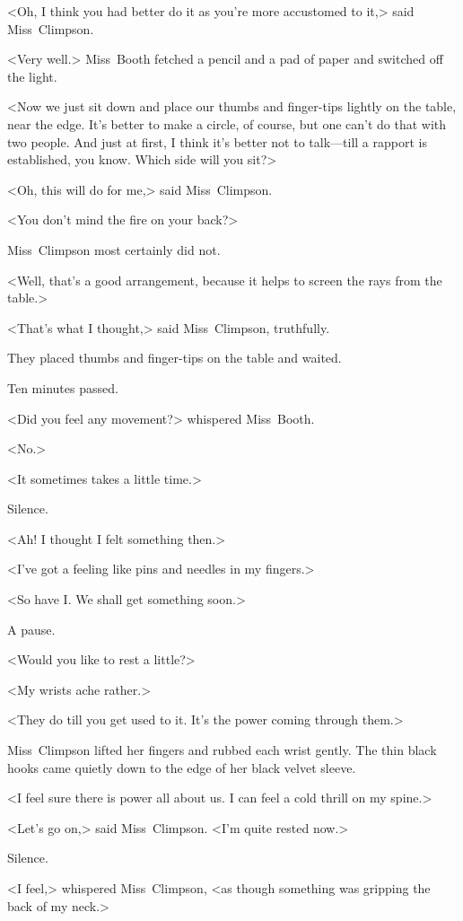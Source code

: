 <Oh, I think you had better do it as you're more accustomed to it,> said Miss~Climpson.

<Very well.> Miss~Booth fetched a pencil and a pad of paper and switched off the light.

<Now we just sit down and place our thumbs and finger-tips lightly on the table, near the edge. It's better to make a circle, of course, but one can't do that with two people. And just at first, I think it's better not to talk—till a rapport is established, you know. Which side will you sit?>

<Oh, this will do for me,> said Miss~Climpson.

<You don't mind the fire on your back?>

Miss~Climpson most certainly did not.

<Well, that's a good arrangement, because it helps to screen the rays from the table.>

<That's what I thought,> said Miss~Climpson, truthfully.

They placed thumbs and finger-tips on the table and waited.

Ten minutes passed.

<Did you feel any movement?> whispered Miss~Booth.

<No.>

<It sometimes takes a little time.>

Silence.

<Ah! I thought I felt something then.>

<I've got a feeling like pins and needles in my fingers.>

<So have I\@. We shall get something soon.>

A pause.

<Would you like to rest a little?>

<My wrists ache rather.>

<They do till you get used to it. It's the power coming through them.>

Miss~Climpson lifted her fingers and rubbed each wrist gently. The thin black hooks came quietly down to the edge of her black velvet sleeve.

<I feel sure there is power all about us. I can feel a cold thrill on my spine.>

<Let's go on,> said Miss~Climpson. <I'm quite rested now.>

Silence.

<I feel,> whispered Miss~Climpson, <as though something was gripping the back of my neck.>

